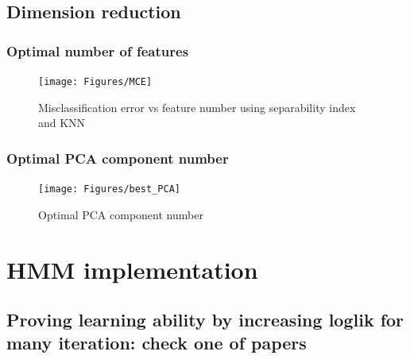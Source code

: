 \subsection{Dimension reduction}
\subsubsection{Optimal number of features}

\begin{figure}[ht!]
	\texttt{[image: Figures/MCE]}
	\caption{Misclassification error vs feature number using separability index and KNN}
	\label{fig:opt-dim}
\end{figure}

\subsubsection{Optimal PCA component number}
\begin{figure}[ht!]
	\texttt{[image: Figures/best\_PCA]}
	\caption{Optimal PCA component number}
	\label{fig:opt-pca}
\end{figure}

\section{HMM implementation}
\subsection{Proving learning ability by increasing loglik for many iteration: check one of papers}